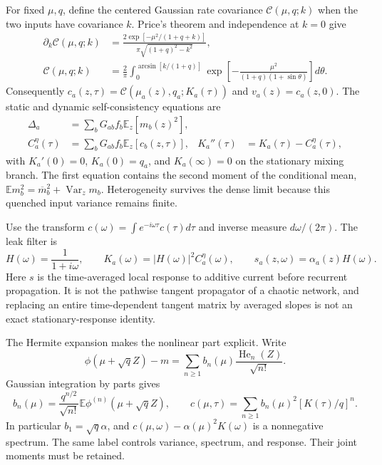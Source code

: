 For fixed $\mu,q$, define the centered Gaussian rate covariance
$\mathcal C(\mu,q;k)$ when the two inputs have covariance $k$. Price's theorem
and independence at $k=0$ give
\begin{align}
 \partial_k\mathcal C(\mu,q;k)
 &=\frac{2\exp[-\mu^2/(1+q+k)]}
         {\pi\sqrt{(1+q)^2-k^2}},\\
 \mathcal C(\mu,q;k)
 &=\frac2\pi\int_0^{\arcsin[k/(1+q)]}
 \exp\!\left[-\frac{\mu^2}{(1+q)(1+\sin\theta)}\right]d\theta.
 \label{eq:an_price}
\end{align}
Consequently $c_a(z,\tau)=\mathcal C(\mu_a(z),q_a;K_a(\tau))$ and
$v_a(z)=c_a(z,0)$. The static and dynamic self-consistency equations are
\begin{align}
 \Delta_a&=\sum_bG_{ab}f_b\mathbb E_z[m_b(z)^2],\\
 C_a^\eta(\tau)&=\sum_bG_{ab}f_b\mathbb E_z[c_b(z,\tau)],&
 K_a''(\tau)&=K_a(\tau)-C_a^\eta(\tau),
 \label{eq:an_selfconsistency}
\end{align}
with $K_a'(0)=0$, $K_a(0)=q_a$, and $K_a(\infty)=0$ on the stationary mixing
branch. The first equation contains the second moment of the conditional
mean, $\mathbb E m_b^2=\overline m_b^2+\operatorname{Var}_z m_b$. Heterogeneity
survives the dense limit because this quenched input variance remains finite.

Use the transform $c(\omega)=\int e^{-i\omega\tau}c(\tau)d\tau$ and inverse
measure $d\omega/(2\pi)$. The leak filter is
\begin{equation}
 H(\omega)=\frac1{1+i\omega},\qquad
 K_a(\omega)=|H(\omega)|^2 C_a^\eta(\omega),\qquad
 s_a(z,\omega)=\alpha_a(z)H(\omega).
 \label{eq:an_filter}
\end{equation}
Here $s$ is the time-averaged local response to additive current before
recurrent propagation. It is not the pathwise tangent propagator of a chaotic
network, and replacing an entire time-dependent tangent matrix by averaged
slopes is not an exact stationary-response identity.

The Hermite expansion makes the nonlinear part explicit. Write
\[
 \phi(\mu+\sqrt q Z)-m
 =\sum_{n\geq1}b_n(\mu)\frac{\operatorname{He}_n(Z)}{\sqrt{n!}}.
\]
Gaussian integration by parts gives
\begin{equation}
 b_n(\mu)=\frac{q^{n/2}}{\sqrt{n!}}
          \mathbb E\phi^{(n)}(\mu+\sqrt q Z),\qquad
 c(\mu,\tau)=\sum_{n\geq1}b_n(\mu)^2[K(\tau)/q]^n.
 \label{eq:an_hermite}
\end{equation}
In particular $b_1=\sqrt q\alpha$, and
$c(\mu,\omega)-\alpha(\mu)^2K(\omega)$ is a nonnegative spectrum. The
same label controls variance, spectrum, and response. Their joint moments
must be retained.

